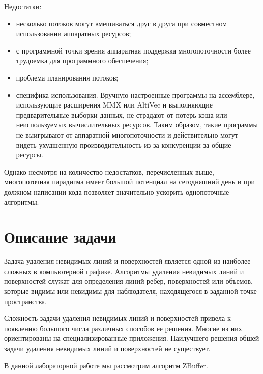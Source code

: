 Недостатки:

\begin{itemize}
	
	\item несколько потоков могут вмешиваться друг в друга при совместном использовании аппаратных ресурсов;
	
	\item с программной точки зрения аппаратная поддержка многопоточности более трудоемка для программного обеспечения;
	
	\item проблема планирования потоков;
	
	\item специфика использования. Вручную настроенные программы на ассемблере, использующие расширения MMX или AltiVec и выполняющие предварительные выборки данных, не страдают от потерь кэша или неиспользуемых вычислительных ресурсов. Таким образом, такие программы не выигрывают от аппаратной многопоточности и действительно могут видеть ухудшенную производительность из-за конкуренции за общие ресурсы.
	
\end{itemize}

Однако несмотря на количество недостатков, перечисленных выше, многопоточная парадигма имеет большой потенциал на сегодняшний день и при должном написании кода позволяет значительно ускорить однопоточные алгоритмы.

\section{Описание задачи}
Задача удаления невидимых линий и поверхностей является одной из наиболее сложных в компьютерной графике. Алгоритмы удаления невидимых линий и поверхностей служат для определения линий ребер, поверхностей или объемов, которые видимы или невидимы для наблюдателя, находящегося в заданной точке пространства.

Сложность задачи удаления невидимых линий и поверхностей привела к появлению большого числа различных способов ее решения. Многие из них ориентированы на специализированные приложения. Наилучшего решения обшей задачи удаления невидимых линий и поверхностей не существует.

В данной лабораторной работе мы рассмотрим алгоритм ZBuffer.
